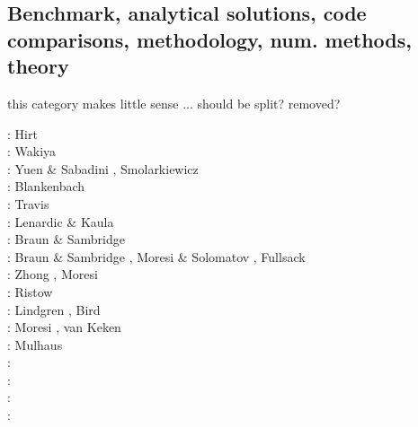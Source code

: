 \subsection{Benchmark, analytical solutions, code comparisons, methodology, num. methods, theory}

{\color{red} this category makes little sense ... should be split? removed? }

\begin{scriptsize}
\nineteenseventyfour: Hirt \etal \cite{hiac74}\\
\nineteenseventyfive: Wakiya \cite{waki75a,waki75b}\\
\nineteeneightyfour: Yuen \& Sabadini \cite{yusa84}, Smolarkiewicz \cite{smol84}\\
\nineteeneightynine: Blankenbach \etal \cite{blbc89}\\
\nineteenninety: Travis \etal \cite{trab90}\\
\nineteenninetythree: Lenardic \& Kaula \cite{leka93}\\
\nineteenninetyfour: Braun \& Sambridge \cite{brsa94}\\
\nineteenninetyfive: Braun \& Sambridge \cite{brsa95}, Moresi \& Solomatov \cite{moso95}, 
                     Fullsack \cite{full95}\\
\nineteenninetysix: Zhong \cite{zhon96}, Moresi \etal \cite{mozg96}\\
\nineteenninetyseven: Ristow \cite{rist97}\\
\nineteenninetynine: Lindgren \cite{lind99}, Bird \cite{bird99}\\
\twothousandone: Moresi \etal\cite{modm01}, van Keken \cite{vank01}\\
\twothousandtwo: Mulhaus \etal \cite{mudm02}\\
\twothousandthree: \cite{taki03}\cite{modm03}\cite{geyu03}\cite{geyu03b}\cite{taxi03}\cite{scpo03}\\
\twothousandfour: \cite{kaps04}\cite{kasa04}\cite{kaks08}\cite{mumc04}\\
\twothousandfive: \cite{mure05}\\
\twothousandsix: \cite{kapo06}\cite{more06}\cite{onmm06}\cite{mudm06}\cite{tact06}\\

\end{scriptsize}
